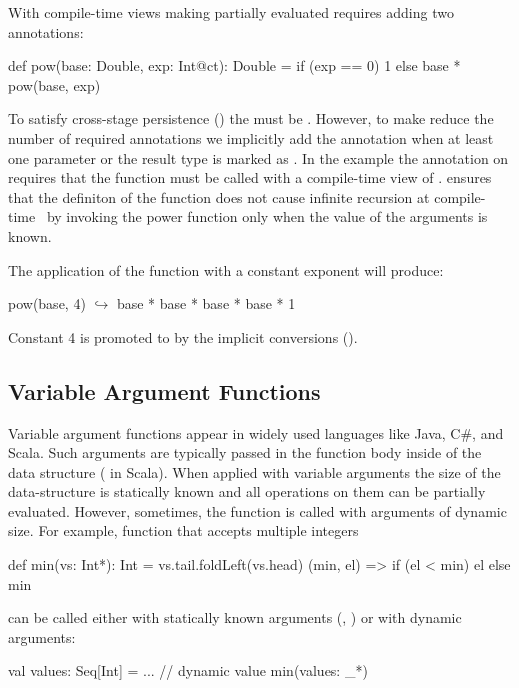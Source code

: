 With compile-time views making partially evaluated requires adding two annotations:

\begin{lstparagraph}
def pow(base: Double, exp: Int@ct): Double =
  if (exp == 0) 1 else base * pow(base, exp)
\end{lstparagraph}

To satisfy cross-stage persistence () the  must be .
However, to make reduce the number of required annotations we implicitly add the  annotation
when at least one parameter or the result type is marked as . In the example
 the  annotation on  requires that the function must be called with
 a compile-time view of . \tool ensures that the definiton of the  function
 does not cause infinite recursion at compile-time~\cite{} by invoking the power function
 only when the value of the  arguments is known.

 The application of the function  with a constant
 exponent will produce:

\begin{lstparagraph}
pow(base, 4)
  $\hookrightarrow$ base * base * base * base * 1
\end{lstparagraph}

Constant 4 is promoted to  by the implicit conversions ().

\subsection{Variable Argument Functions}
\label{sct:varargs}

Variable argument functions appear in widely used languages like Java, C\#, and Scala.
 Such arguments are typically passed in the function body inside of the data structure
 (\eg {} in Scala). When applied with variable arguments the size of the
 data-structure is statically known and all operations on them can be partially
 evaluated. However, sometimes, the function is called with arguments of dynamic size.
 For example, function  that accepts multiple integers\begin{lstparagraph}
def min(vs: Int*): Int = vs.tail.foldLeft(vs.head) {
  (min, el) => if (el < min) el else min
}
\end{lstparagraph}can be called either with statically known arguments
 (\eg, ) or with dynamic arguments:\begin{lstparagraph}
val values: Seq[Int] = ... // dynamic value
min(values: _*)
\end{lstparagraph}

